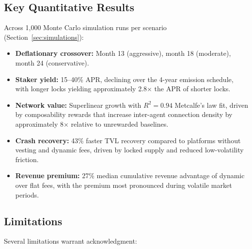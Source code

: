\subsection{Key Quantitative Results}
\label{subsec:key-results}

Across 1{,}000 Monte Carlo simulation runs per scenario
(Section~\ref{sec:simulations}):

\begin{itemize}
  \item \textbf{Deflationary crossover:} Month 13 (aggressive), month 18
    (moderate), month 24 (conservative).
  \item \textbf{Staker yield:} 15--40\% APR, declining over the 4-year
    emission schedule, with longer locks yielding approximately 2.8$\times$
    the APR of shorter locks.
  \item \textbf{Network value:} Superlinear growth with $R^2 = 0.94$
    Metcalfe's law fit, driven by composability rewards that increase
    inter-agent connection density by approximately 8$\times$ relative to
    unrewarded baselines.
  \item \textbf{Crash recovery:} 43\% faster TVL recovery compared to
    platforms without vesting and dynamic fees, driven by locked supply and
    reduced low-volatility friction.
  \item \textbf{Revenue premium:} 27\% median cumulative revenue advantage
    of dynamic over flat fees, with the premium most pronounced during
    volatile market periods.
\end{itemize}

\subsection{Limitations}
\label{subsec:limitations}

Several limitations warrant acknowledgment:

